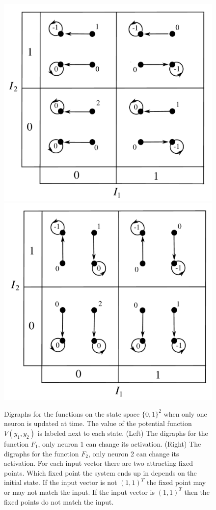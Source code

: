 \begin{figure}[ht]
\centering
\includegraphics[scale=0.342]{./images/TwoNodeHopfieldUpdate1.pdf}
\includegraphics[scale=0.342]{./images/TwoNodeHopfieldUpdate2.pdf}
\caption{Digraphs for the functions on the state space $\{0,1\}^2$ when only 
one neuron is updated at time.  The value of the potential function 
$V(y_1,y_2)$ is labeled next to each state.  (Left) The digraphs for the 
function $F_1$, only neuron 1 can change its activation.  (Right) The digraphs 
for the function $F_2$, only neuron 2 can change its activation.  For each 
input vector there are two attracting fixed points.  Which fixed point the 
system ends up in depends on the initial state.  If the input vector is not 
$(1,1)^T$ the fixed point may or may not match the input.  If the input vector 
is $(1,1)^T$ then the fixed points do not match the input.}
\label{F:TwoNodeHopfieldSingle}
\end{figure}

